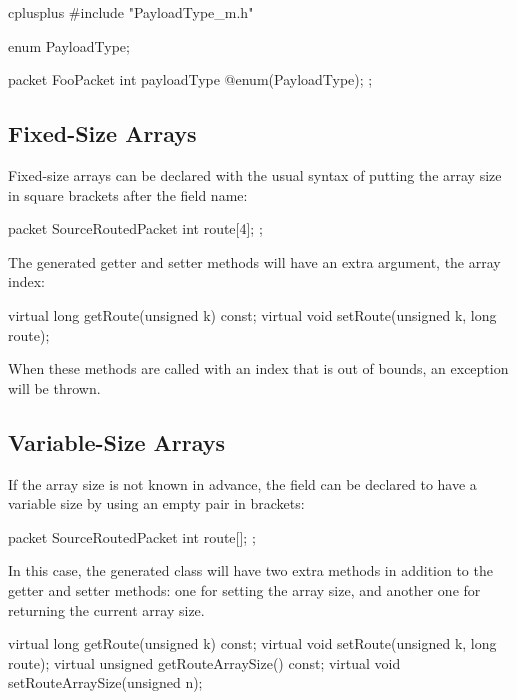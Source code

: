 \begin{msg}
cplusplus {{
#include "PayloadType_m.h"
}}

enum PayloadType;

packet FooPacket
{
    int payloadType @enum(PayloadType);
};
\end{msg}



\subsection{Fixed-Size Arrays}
\label{sec:msg-defs:fixed-size-arrays}

Fixed-size arrays can be declared with the usual syntax of putting the
array size in square brackets after the field name:

\begin{msg}
packet SourceRoutedPacket
{
    int route[4];
};
\end{msg}

The generated getter and setter methods will have an extra  argument,
the array index:

\begin{cpp}
virtual long getRoute(unsigned k) const;
virtual void setRoute(unsigned k, long route);
\end{cpp}

When these methods are called with an index that is out of bounds, an
exception will be thrown.


\subsection{Variable-Size Arrays}
\label{sec:msg-defs:variable-size-arrays}

If the array size is not known in advance, the field can be declared
to have a variable size by using an empty pair in brackets:

\begin{msg}
packet SourceRoutedPacket
{
    int route[];
};
\end{msg}

In this case, the generated class will have two extra methods in addition
to the getter and setter methods: one for setting the array size, and another
one for returning the current array size.

\begin{cpp}
virtual long getRoute(unsigned k) const;
virtual void setRoute(unsigned k, long route);
virtual unsigned getRouteArraySize() const;
virtual void setRouteArraySize(unsigned n);
\end{cpp}

